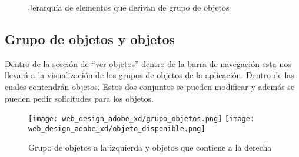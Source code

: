 \begin{figure}
    \caption{Jerarquía de elementos que derivan de grupo de objetos}
\end{figure}

\subsection{Grupo de objetos y objetos}

Dentro de la sección de ``ver objetos'' dentro de la barra de navegación esta nos llevará a la visualización de los grupos de objetos de la aplicación. Dentro de las cuales contendrán objetos. Estos dos conjuntos se pueden modificar y además se pueden pedir solicitudes para los objetos.

\begin{figure}
    \begin{center}
        \texttt{[image: web\_design\_adobe\_xd/grupo\_objetos.png]}
        \texttt{[image: web\_design\_adobe\_xd/objeto\_disponible.png]}
        \caption{Grupo de objetos a la izquierda y objetos que contiene a la derecha}
    \end{center}
\end{figure}